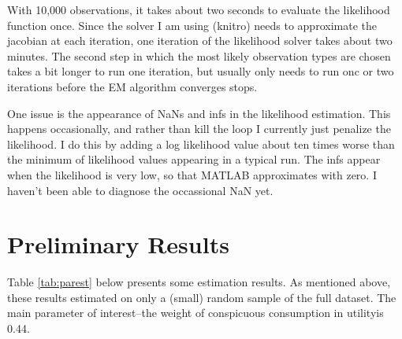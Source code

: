 \documentclass{article}
\begin{document}
With 10,000 observations, it takes about two seconds to evaluate the likelihood function once.
Since the solver I am using (knitro) needs to approximate the jacobian at each iteration, one iteration of the likelihood solver takes about two minutes.
The second step in which the most likely observation types are chosen takes a bit longer to run one iteration, but usually only needs to run onc or two iterations before the EM algorithm converges stops.

One issue is the appearance of NaNs and infs in the likelihood estimation. 
This happens occasionally, and rather than kill the loop I currently just penalize the likelihood.
I do this by adding a log likelihood value about ten times worse than the minimum of likelihood values appearing in a typical run.
The infs appear when the likelihood is very low, so that MATLAB approximates with zero.
I haven't been able to diagnose the occassional NaN yet.
\section{Preliminary Results}
Table \ref{tab:parest} below presents some estimation results.  
As mentioned above, these results estimated on only a (small) random sample of the full dataset.
The main parameter of interest--the weight of conspicuous consumption in utilityis 0.44.  
\end{document}
